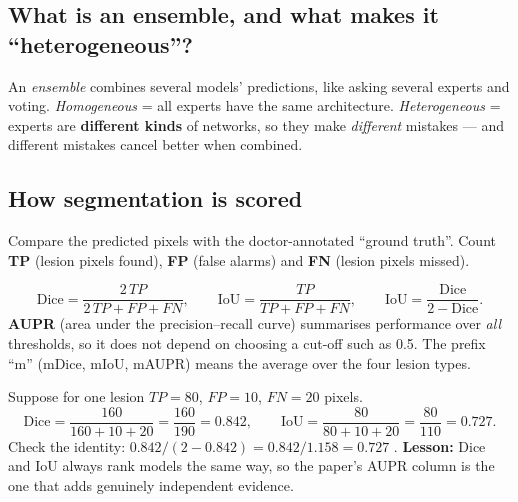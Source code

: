 \documentclass[11pt,a4paper]{article}
\newcommand{\cmark}{\textcolor{okgreen}{\ding{51}}}
\begin{document}
\subsection{What is an ensemble, and what makes it ``heterogeneous''?}
An \emph{ensemble} combines several models' predictions, like asking several experts and
voting. \emph{Homogeneous} = all experts have the same architecture.
\emph{Heterogeneous} = experts are \textbf{different kinds} of networks, so they make
\emph{different} mistakes --- and different mistakes cancel better when combined.

\subsection{How segmentation is scored}
Compare the predicted pixels with the doctor-annotated ``ground truth''.
Count \textbf{TP} (lesion pixels found), \textbf{FP} (false alarms) and \textbf{FN} (lesion pixels missed).

\begin{center}
\end{center}

\[
\text{Dice}=\frac{2\,TP}{2\,TP+FP+FN},\qquad
\text{IoU}=\frac{TP}{TP+FP+FN},\qquad
\text{IoU}=\frac{\text{Dice}}{2-\text{Dice}} .
\]
\textbf{AUPR} (area under the precision--recall curve) summarises performance over \emph{all}
thresholds, so it does not depend on choosing a cut-off such as 0.5. The prefix ``m'' (mDice,
mIoU, mAUPR) means the average over the four lesion types.

\begin{worked}
Suppose for one lesion $TP=80$, $FP=10$, $FN=20$ pixels.
\[
\text{Dice}=\frac{160}{160+10+20}=\frac{160}{190}=0.842,\qquad
\text{IoU}=\frac{80}{80+10+20}=\frac{80}{110}=0.727.
\]
Check the identity: $0.842/(2-0.842)=0.842/1.158=0.727$ \cmark.
\textbf{Lesson:} Dice and IoU always rank models the same way, so the paper's AUPR column is the one
that adds genuinely independent evidence.
\end{worked}
\end{document}

